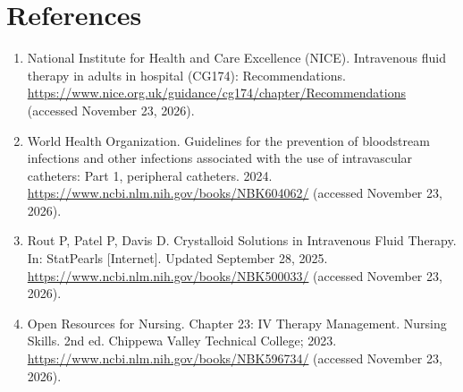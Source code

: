 \section*{References}
\begin{enumerate}
  \item National Institute for Health and Care Excellence (NICE). Intravenous fluid therapy in adults in hospital (CG174): Recommendations. \url{https://www.nice.org.uk/guidance/cg174/chapter/Recommendations} (accessed November 23, 2026).
  \item World Health Organization. Guidelines for the prevention of bloodstream infections and other infections associated with the use of intravascular catheters: Part 1, peripheral catheters. 2024. \url{https://www.ncbi.nlm.nih.gov/books/NBK604062/} (accessed November 23, 2026).
  \item Rout P, Patel P, Davis D. Crystalloid Solutions in Intravenous Fluid Therapy. In: StatPearls [Internet]. Updated September 28, 2025. \url{https://www.ncbi.nlm.nih.gov/books/NBK500033/} (accessed November 23, 2026).
  \item Open Resources for Nursing. Chapter 23: IV Therapy Management. Nursing Skills. 2nd ed. Chippewa Valley Technical College; 2023. \url{https://www.ncbi.nlm.nih.gov/books/NBK596734/} (accessed November 23, 2026).
\end{enumerate}

\clearpage
